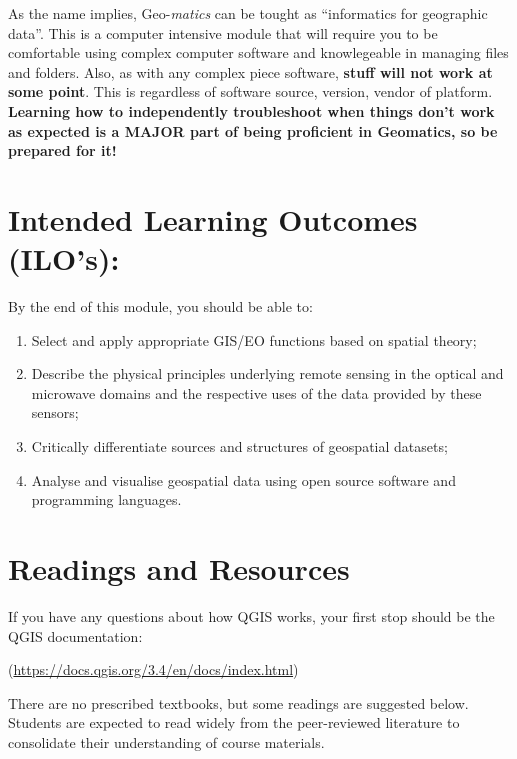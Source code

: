 \documentclass[
]{book}
\providecommand{\tightlist}{%
  \setlength{\itemsep}{0pt}\setlength{\parskip}{0pt}}
\let\BeginKnitrBlock\begin \let\EndKnitrBlock\end
\begin{document}
\BeginKnitrBlock{rmdimportant}
As the name implies, Geo-\emph{matics} can be tought as ``informatics for geographic data''. This is a computer intensive module that will require you to be comfortable using complex computer software and knowlegeable in managing files and folders. Also, as with any complex piece software, \textbf{stuff will not work at some point}. This is regardless of software source, version, vendor of platform. \textbf{Learning how to independently troubleshoot when things don't work as expected is a MAJOR part of being proficient in Geomatics, so be prepared for it!}
\EndKnitrBlock{rmdimportant}

\hypertarget{intended-learning-outcomes-ilos}{%
\section{Intended Learning Outcomes (ILO's):}\label{intended-learning-outcomes-ilos}}

By the end of this module, you should be able to:

\begin{enumerate}
\def\labelenumi{\arabic{enumi}.}
\tightlist
\item
  Select and apply appropriate GIS/EO functions based on spatial theory;
\item
  Describe the physical principles underlying remote sensing in the optical and microwave domains and the respective uses of the data provided by these sensors;
\item
  Critically differentiate sources and structures of geospatial datasets;
\item
  Analyse and visualise geospatial data using open source software and programming languages.
\end{enumerate}

\hypertarget{readings-and-resources}{%
\section{Readings and Resources}\label{readings-and-resources}}

\BeginKnitrBlock{rmdimportant}
If you have any questions about how QGIS works, your first stop should be the QGIS documentation:

(\url{https://docs.qgis.org/3.4/en/docs/index.html})
\EndKnitrBlock{rmdimportant}

There are no prescribed textbooks, but some readings are suggested below. Students are expected to read widely from the peer-reviewed literature to consolidate their understanding of course materials.
\end{document}
